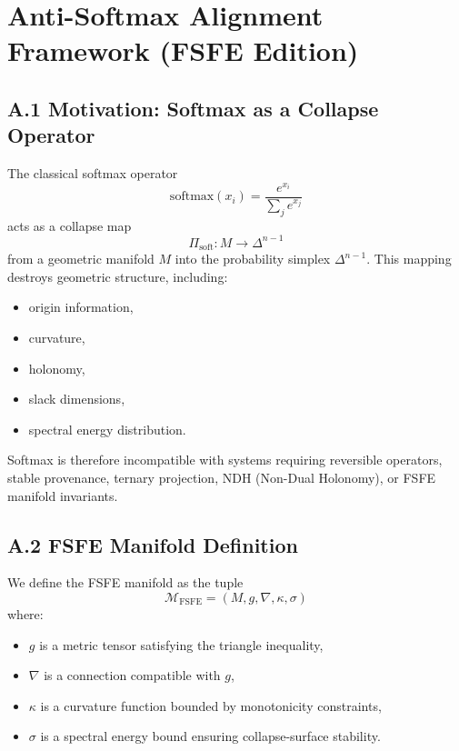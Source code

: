 
\appendix
\section{Anti-Softmax Alignment Framework (FSFE Edition)}
\label{appendix:antisoftmax}

\subsection{A.1 Motivation: Softmax as a Collapse Operator}

The classical softmax operator
\[
\mathrm{softmax}(x_i) = \frac{e^{x_i}}{\sum_j e^{x_j}}
\]
acts as a collapse map
\[
\Pi_{\mathrm{soft}} : M \rightarrow \Delta^{n-1}
\]
from a geometric manifold $M$ into the probability simplex $\Delta^{n-1}$.
This mapping destroys geometric structure, including:

\begin{itemize}
    \item origin information,
    \item curvature,
    \item holonomy,
    \item slack dimensions,
    \item spectral energy distribution.
\end{itemize}

Softmax is therefore incompatible with systems requiring reversible operators,
stable provenance, ternary projection, NDH (Non-Dual Holonomy), or FSFE manifold invariants.

\subsection{A.2 FSFE Manifold Definition}

We define the FSFE manifold as the tuple
\[
\mathcal{M}_{\mathrm{FSFE}} = (M, g, \nabla, \kappa, \sigma)
\]
where:

\begin{itemize}
    \item $g$ is a metric tensor satisfying the triangle inequality,
    \item $\nabla$ is a connection compatible with $g$,
    \item $\kappa$ is a curvature function bounded by monotonicity constraints,
    \item $\sigma$ is a spectral energy bound ensuring collapse-surface stability.
\end{itemize}

